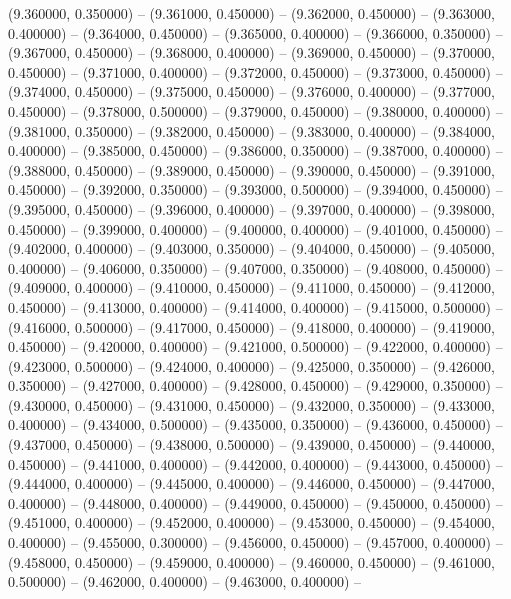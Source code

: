 (9.360000, 0.350000) -- 
(9.361000, 0.450000) -- 
(9.362000, 0.450000) -- 
(9.363000, 0.400000) -- 
(9.364000, 0.450000) -- 
(9.365000, 0.400000) -- 
(9.366000, 0.350000) -- 
(9.367000, 0.450000) -- 
(9.368000, 0.400000) -- 
(9.369000, 0.450000) -- 
(9.370000, 0.450000) -- 
(9.371000, 0.400000) -- 
(9.372000, 0.450000) -- 
(9.373000, 0.450000) -- 
(9.374000, 0.450000) -- 
(9.375000, 0.450000) -- 
(9.376000, 0.400000) -- 
(9.377000, 0.450000) -- 
(9.378000, 0.500000) -- 
(9.379000, 0.450000) -- 
(9.380000, 0.400000) -- 
(9.381000, 0.350000) -- 
(9.382000, 0.450000) -- 
(9.383000, 0.400000) -- 
(9.384000, 0.400000) -- 
(9.385000, 0.450000) -- 
(9.386000, 0.350000) -- 
(9.387000, 0.400000) -- 
(9.388000, 0.450000) -- 
(9.389000, 0.450000) -- 
(9.390000, 0.450000) -- 
(9.391000, 0.450000) -- 
(9.392000, 0.350000) -- 
(9.393000, 0.500000) -- 
(9.394000, 0.450000) -- 
(9.395000, 0.450000) -- 
(9.396000, 0.400000) -- 
(9.397000, 0.400000) -- 
(9.398000, 0.450000) -- 
(9.399000, 0.400000) -- 
(9.400000, 0.400000) -- 
(9.401000, 0.450000) -- 
(9.402000, 0.400000) -- 
(9.403000, 0.350000) -- 
(9.404000, 0.450000) -- 
(9.405000, 0.400000) -- 
(9.406000, 0.350000) -- 
(9.407000, 0.350000) -- 
(9.408000, 0.450000) -- 
(9.409000, 0.400000) -- 
(9.410000, 0.450000) -- 
(9.411000, 0.450000) -- 
(9.412000, 0.450000) -- 
(9.413000, 0.400000) -- 
(9.414000, 0.400000) -- 
(9.415000, 0.500000) -- 
(9.416000, 0.500000) -- 
(9.417000, 0.450000) -- 
(9.418000, 0.400000) -- 
(9.419000, 0.450000) -- 
(9.420000, 0.400000) -- 
(9.421000, 0.500000) -- 
(9.422000, 0.400000) -- 
(9.423000, 0.500000) -- 
(9.424000, 0.400000) -- 
(9.425000, 0.350000) -- 
(9.426000, 0.350000) -- 
(9.427000, 0.400000) -- 
(9.428000, 0.450000) -- 
(9.429000, 0.350000) -- 
(9.430000, 0.450000) -- 
(9.431000, 0.450000) -- 
(9.432000, 0.350000) -- 
(9.433000, 0.400000) -- 
(9.434000, 0.500000) -- 
(9.435000, 0.350000) -- 
(9.436000, 0.450000) -- 
(9.437000, 0.450000) -- 
(9.438000, 0.500000) -- 
(9.439000, 0.450000) -- 
(9.440000, 0.450000) -- 
(9.441000, 0.400000) -- 
(9.442000, 0.400000) -- 
(9.443000, 0.450000) -- 
(9.444000, 0.400000) -- 
(9.445000, 0.400000) -- 
(9.446000, 0.450000) -- 
(9.447000, 0.400000) -- 
(9.448000, 0.400000) -- 
(9.449000, 0.450000) -- 
(9.450000, 0.450000) -- 
(9.451000, 0.400000) -- 
(9.452000, 0.400000) -- 
(9.453000, 0.450000) -- 
(9.454000, 0.400000) -- 
(9.455000, 0.300000) -- 
(9.456000, 0.450000) -- 
(9.457000, 0.400000) -- 
(9.458000, 0.450000) -- 
(9.459000, 0.400000) -- 
(9.460000, 0.450000) -- 
(9.461000, 0.500000) -- 
(9.462000, 0.400000) -- 
(9.463000, 0.400000) -- 
